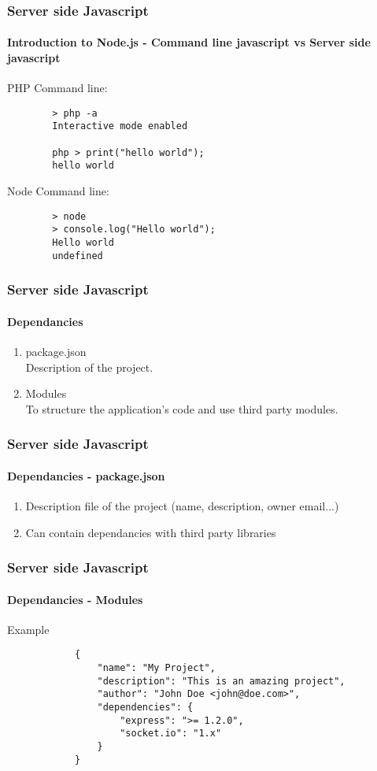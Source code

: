 \documentclass{beamer}
\begin{document}
	\begin{frame}[fragile]
		\frametitle{Server side Javascript}
		\framesubtitle{Introduction to Node.js - Command line javascript vs Server side javascript}

		PHP Command line:
		\begin{verbatim}
		> php -a
		Interactive mode enabled

		php > print("hello world");
		hello world
		\end{verbatim}

		Node Command line:
		\begin{verbatim}
		> node
		> console.log("Hello world");
		Hello world
		undefined
		\end{verbatim}
	\end{frame}


	\begin{frame}
		\frametitle{Server side Javascript}
		\framesubtitle{Dependancies}
		\begin{enumerate}
			\item package.json \\
				Description of the project.
			\item Modules \\
				To structure the application's code and use third party modules.
		\end{enumerate}
	\end{frame}

	\begin{frame}
		\frametitle{Server side Javascript}
		\framesubtitle{Dependancies - package.json}

		\begin{enumerate}
			\item Description file of the project (name, description, owner
				email...)
			\item Can contain dependancies with third party libraries
		\end{enumerate}
	\end{frame}

	\begin{frame}[fragile]
		\frametitle{Server side Javascript}
		\framesubtitle{Dependancies - Modules}
		Example
		\begin{verbatim}
			{
			    "name": "My Project",
			    "description": "This is an amazing project",
			    "author": "John Doe <john@doe.com>",
			    "dependencies": {
			        "express": ">= 1.2.0",
			        "socket.io": "1.x"
			    }
			}
		\end{verbatim}
	\end{frame}
\end{document}
